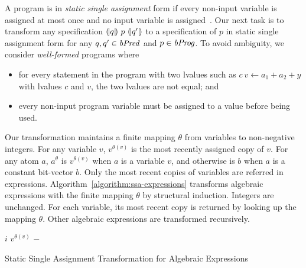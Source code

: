 
A program is in \emph{static single assignment} form if every non-input variable
is assigned at most once and no input variable is assigned~\cite{AWZ:88:DQVP}.
Our next task is to transform any specification
${(\!|}{q}{|\!)}~{p}~{(\!|}{q'}{|\!)}$ to a specification of $p$ in
static single  assignment form for any $q, q' \in \mathit{bPred}$ and $p \in
\mathit{bProg}$.
To avoid ambiguity, we consider \emph{well-formed} programs where
\begin{itemize}
\item for every statement in the program with two lvalues such as $c\ v \leftarrow a_1 + a_2 + y$ with lvalues $c$ and $v$, the two lvalues are not equal; and
\item every non-input program variable must be assigned to a value
  before being used.
\end{itemize}

Our transformation maintains a finite mapping $\theta$ from variables to
non-negative integers. For any variable $v$, $v^{\theta(v)}$ is
the most recently assigned copy of $v$.
For any atom $a$, $a^{\theta}$ is $v^{\theta(v)}$ when $a$ is a variable $v$, and otherwise is $b$ when $a$ is a constant bit-vector $b$.
Only the most recent copies of variables are referred in
expressions. Algorithm~\ref{algorithm:ssa-expressions}
transforms algebraic expressions with the finite mapping $\theta$ by
structural induction. Integers are unchanged. For each variable, its
most recent copy is returned by looking up the mapping $\theta$. Other
algebraic expressions are transformed recursively.

\begin{algorithm}
  \begin{algorithmic}[1]
       \Return $i$ \EndCase
       \Return $v^{\theta(v)}$ \EndCase
       \Return $-$ \EndCase
      \EndCase
      \EndCase
      \EndCase
    \EndMatch
    \EndFunction
  \end{algorithmic}
  \caption{Static Single Assignment Transformation for Algebraic Expressions}
  \label{algorithm:ssa-expressions}
\end{algorithm}

